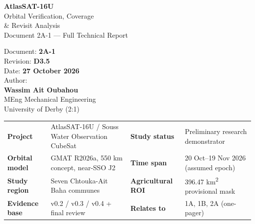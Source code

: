 \documentclass[10pt,a4paper]{article}
\begin{document}
\thispagestyle{plain}
\begin{mdframed}[backgroundcolor=atlasblue,linewidth=0pt,innertopmargin=20pt,innerbottommargin=20pt,innerleftmargin=20pt,innerrightmargin=20pt]
\begin{minipage}[c]{0.65\linewidth}
{\fontsize{22}{26}\selectfont\bfseries\color{white}AtlasSAT-16U}\\[6pt]
{\fontsize{14}{18}\selectfont\color{white!85!atlasblue}Orbital Verification, Coverage \\ \& Revisit Analysis}\\[4pt]
{\fontsize{10}{13}\selectfont\color{white!70!atlasblue}Document 2A-1 --- Full Technical Report}
\end{minipage}\hfill
\begin{minipage}[c]{0.30\linewidth}\raggedleft
{\fontsize{8.5}{12}\selectfont\color{white!70!atlasblue}
Document: \textbf{2A-1}\\Revision: \textbf{D3.5}\\Date: \textbf{27 October 2026}\\[6pt]
Author:\\ \textbf{Wassim Ait Oubahou}\\ MEng Mechanical Engineering\\University of Derby (2:1)}
\end{minipage}
\end{mdframed}
\vspace{8pt}
{\fontsize{9}{12}\selectfont
\begin{tabularx}{\linewidth}{@{}lXlX@{}}
\toprule\rowcolor{headerbg}\multicolumn{4}{@{}l}{\textbf{\textcolor{atlasblue}{Document information}}}\\\midrule
\textbf{Project} & AtlasSAT-16U / Souss Water Observation CubeSat & \textbf{Study status} & Preliminary research demonstrator\\
\rowcolor{rowalt}\textbf{Orbital model} & GMAT R2026a, 550 km concept, near-SSO J2 & \textbf{Time span} & 20 Oct--19 Nov 2026 (assumed epoch)\\
\textbf{Study region} & Seven Chtouka-Ait Baha communes & \textbf{Agricultural ROI} & 396.47 km\textsuperscript{2} provisional mask\\
\rowcolor{rowalt}\textbf{Evidence base} & v0.2 / v0.3 / v0.4 + final review & \textbf{Relates to} & 1A, 1B, 2A (one-pager)\\
\bottomrule
\end{tabularx}}
\vspace{8pt}
\end{document}
